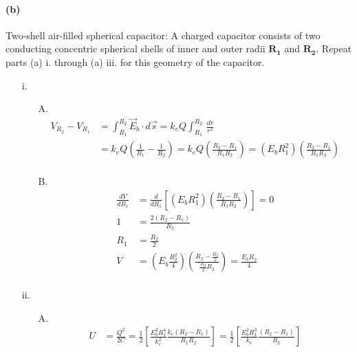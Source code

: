 \documentclass[]{article}
\begin{document}
{		\paragraph{(b)} Two-shell air-filled spherical capacitor: A charged capacitor consists of two conducting concentric spherical shells of inner and outer radii $\bm{R_1}$ and $\bm{R_2}$. Repeat parts (a) i. through (a) iii. for this geometry of the capacitor.
			\begin{enumerate}
				\item[i.] 
				\begin{enumerate}
					\item[A.] 
					\begin{equation*}
						\begin{split}
							V_{R_2} - V_{R_1} &= \int_{R_1}^{R_2} \vec{E}_b \cdot d\vec{s} = k_e Q \int_{R_1}^{R_2} \, \frac{dr}{r^2} \\
							&=  k_e Q \left( \frac{1}{R_1} - \frac{1}{R_2} \right) = k_e Q \left( \frac{R_2 - R_1}{R_1 R_2} \right) = (E_b R_1^2) \left( \frac{R_2 - R_1}{R_1 R_2} \right) \\
						\end{split}
					\end{equation*}
					\item[B.]
					\begin{equation*}
						\begin{split}
							\frac{dV}{dR_1} &= \frac{d}{dR_1} \left[ (E_b R_1^2) \left( \frac{R_2 - R_1}{R_1 R_2} \right) \right] = 0 \\
							1 &= \frac{2(R_2 - R_1)}{R_2} \\
							R_1 &= \frac{R_2}{2} \\
							V &= (E_b \frac{R^2_2}{4}) \left( \frac{R_2 - \frac{R_2}{2}}{\frac{R_2}{2} R_2} \right) = \frac{E_b R_2}{4} \\
						\end{split}
					\end{equation*}
					
				\end{enumerate}
				\item[ii.]
				\begin{enumerate}
					\item[A.]
						\begin{equation*}
							\begin{split}
								U &= \frac{Q^2}{2C} = \frac{1}{2} \left[ \frac{E_b^2 R_1^4}{k_e^2} \frac{k_e(R_2 - R_1)}{R_1 R_2} \right] = \frac{1}{2} \left[ \frac{E_b^2 R_1^3}{k_e} \frac{(R_2 - R_1)}{R_2} \right]  \\
							\end{split}
						\end{equation*}
					

\end{enumerate}
\end{enumerate}}
\end{document}

